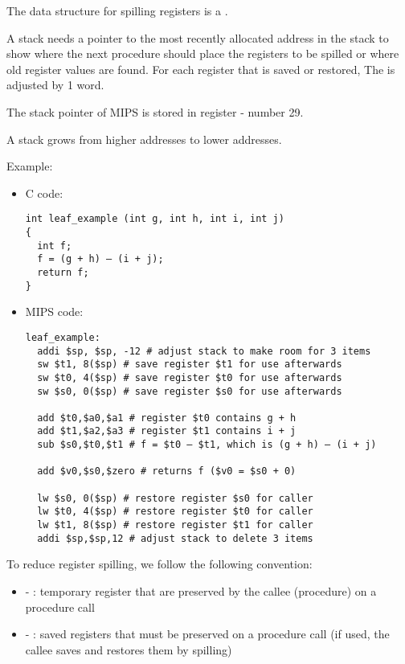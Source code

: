       \par The data structure for spilling registers is a .
      \par A stack needs a pointer to the most recently allocated address in
        the stack to show where the next procedure should place the registers
        to be spilled or where old register values are found. For each register
        that is saved or restored, The  is adjusted by 1 word.
      \par The stack pointer of MIPS is stored in register  - number 29.
      \par A stack grows from higher addresses to lower addresses.
      \par Example:
      \begin{itemize}
        \item C code:
          \begin{lstlisting}
int leaf_example (int g, int h, int i, int j)
{
  int f;
  f = (g + h) – (i + j);
  return f;
}
          \end{lstlisting}
          \item MIPS code:
            \begin{lstlisting}
leaf_example:
  addi $sp, $sp, -12 # adjust stack to make room for 3 items
  sw $t1, 8($sp) # save register $t1 for use afterwards
  sw $t0, 4($sp) # save register $t0 for use afterwards
  sw $s0, 0($sp) # save register $s0 for use afterwards

  add $t0,$a0,$a1 # register $t0 contains g + h
  add $t1,$a2,$a3 # register $t1 contains i + j
  sub $s0,$t0,$t1 # f = $t0 – $t1, which is (g + h) – (i + j)

  add $v0,$s0,$zero # returns f ($v0 = $s0 + 0)

  lw $s0, 0($sp) # restore register $s0 for caller
  lw $t0, 4($sp) # restore register $t0 for caller
  lw $t1, 8($sp) # restore register $t1 for caller
  addi $sp,$sp,12 # adjust stack to delete 3 items
            \end{lstlisting}
      \end{itemize}

      \par To reduce register spilling, we follow the following convention:
      \begin{itemize}
        \item {} - : temporary register that are 
          preserved by the callee (procedure) on a procedure call
        \item {} - : saved registers that must be preserved on
          a procedure call (if used, the callee saves and restores them by
          spilling)
      \end{itemize}

